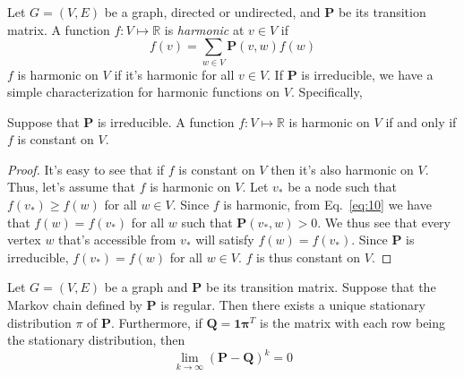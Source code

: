 Let $G = (V,E)$ be a graph, directed or undirected, and $\mathbf{P}$
be its transition matrix. A function $f \colon V \mapsto \mathbb{R}$
is {\em harmonic} at $v \in V$ if
\begin{equation}
  \label{eq:10}
  f(v) = \sum_{w \in V}{\mathbf{P}(v,w) f(w)}
\end{equation}
$f$ is harmonic on $V$ if it's harmonic for all $v \in V$. If $\mathbf{P}$
is irreducible, we have a simple characterization for harmonic
functions on $V$. Specifically,
\begin{lemma}
  \label{lem:1}
  Suppose that $\mathbf{P}$ is irreducible. A function $f \colon V \mapsto
  \mathbb{R}$ is harmonic on $V$ if and only if $f$ is constant on
  $V$. 
\end{lemma}
\begin{proof}
  It's easy to see that if $f$ is constant on $V$ then it's also
  harmonic on $V$. Thus, let's assume that $f$ is harmonic on $V$.
  Let $v_*$ be a node such that $f(v_*) \geq f(w)$ for all $w \in
  V$. Since $f$ is harmonic, from Eq.~\eqref{eq:10} we have that $f(w)
  = f(v_*)$ for all $w$ such that $\mathbf{P}(v_*,w) > 0$. We thus see
  that every vertex $w$ that's accessible from $v_*$ will satisfy
  $f(w) = f(v_*)$. Since $\mathbf{P}$ is irreducible, $f(v_*) = f(w)$ for
  all $w \in V$. $f$ is thus constant on $V$.
\end{proof}

\begin{proposition}
  \label{prop:6}
  Let $G = (V,E)$ be a graph and $\mathbf{P}$ be its transition
  matrix. Suppose that the Markov chain defined by $\mathbf{P}$ is
  regular. Then there exists a unique stationary distribution $\pi$ of
  $\mathbf{P}$. Furthermore, if $\mathbf{Q} = \mathbf{1} \mathbf{\pi}^{T}$ is the
  matrix with each row being the stationary distribution, then
  \begin{equation}
    \label{eq:22}
    \lim_{k \rightarrow \infty}(\mathbf{P} - \mathbf{Q})^{k} = 0 
  \end{equation}
\end{proposition}

